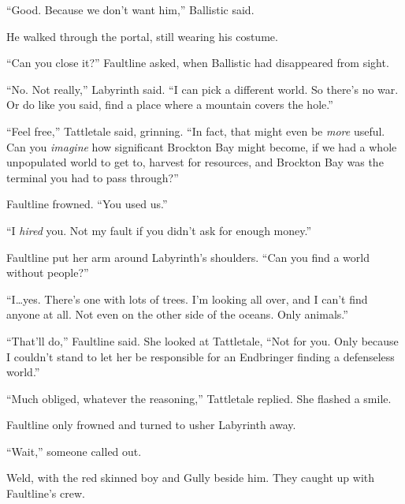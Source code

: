 ``Good.  Because we don't want him,'' Ballistic said.



He walked through the portal, still wearing his costume.



``Can you close it?'' Faultline asked, when Ballistic had disappeared from sight.



``No.  Not really,'' Labyrinth said.  ``I can pick a different world.  So there's no war.  Or do like you said, find a place where a mountain covers the hole.''



``Feel free,'' Tattletale said, grinning.  ``In fact, that might even be \emph{more} useful.  Can you \emph{imagine} how significant Brockton Bay might become, if we had a whole unpopulated world to get to, harvest for resources, and Brockton Bay was the terminal you had to pass through?''



Faultline frowned.  ``You used us.''



``I \emph{hired} you.  Not my fault if you didn't ask for enough money.''



Faultline put her arm around Labyrinth's shoulders.  ``Can you find a world without people?''



``I\ldots yes.  There's one with lots of trees.  I'm looking all over, and I can't find anyone at all.  Not even on the other side of the oceans.  Only animals.''



``That'll do,'' Faultline said.  She looked at Tattletale, ``Not for you.  Only because I couldn't stand to let her be responsible for an Endbringer finding a defenseless world.''



``Much obliged, whatever the reasoning,'' Tattletale replied.  She flashed a smile.



Faultline only frowned and turned to usher Labyrinth away.



``Wait,'' someone called out.



Weld, with the red skinned boy and Gully beside him.  They caught up with Faultline's crew.



